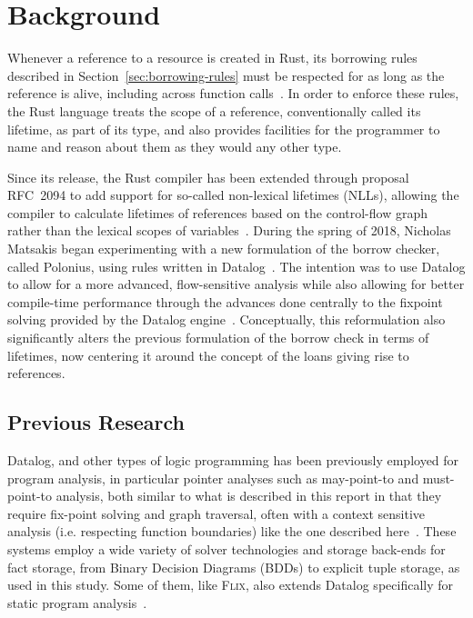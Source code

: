 \documentclass[11pt,a4paper,twoside,openany]{report}
\begin{document}
\chapter{Background}
Whenever a reference to a resource is created in Rust, its borrowing rules
described in Section~\ref{sec:borrowing-rules} must be respected for as long as
the reference is alive, including across function
calls~\cite{nichols_rust_nodate}. In order to enforce these rules, the Rust
language treats the scope of a reference, conventionally called its lifetime, as
part of its type, and also provides facilities for the programmer to name and
reason about them as they would any other type.

{\sloppy
Since its release, the Rust compiler has been extended through proposal RFC~2094
to add support for so-called non-lexical lifetimes (NLLs), allowing the compiler
to calculate lifetimes of references based on the control-flow graph rather than
the lexical scopes of variables~\cite{noauthor_rfc_2019}. During the spring of
2018, Nicholas Matsakis began experimenting with a new formulation of the borrow
checker, called Polonius, using rules written in
Datalog~\cite{matsakis_alias-based_2018}. The intention was to use Datalog to
allow for a more advanced, flow-sensitive analysis while also allowing for
better compile-time performance through the advances done centrally to the
fixpoint solving provided by the Datalog engine~\cite{datafrog}. Conceptually,
this reformulation also significantly alters the previous formulation of the
borrow check in terms of lifetimes, now centering it around the concept of the
loans giving rise to references.}

\section{Previous Research}
Datalog, and other types of logic programming has been previously employed for
program analysis, in particular pointer analyses such as may-point-to and
must-point-to analysis, both similar to what is described in this report in that
they require fix-point solving and graph traversal, often with a context
sensitive analysis (i.e. respecting function boundaries) like the
one described here~\cite{Dawson:1996:PPA:231379.231399,
  Berndl:2003:PAU:780822.781144, hajiyev_codequest:_2005,
  Whaley:2004:CCP:996893.996859, lam_context-sensitive_2005,
  Benton:2007:ISD:1273920.1273923, Hardekopf:2007:AGF:1250734.1250767,
  Smaragdakis:2011:PYC:1926385.1926390, smaragdakis_using_2010,
  balatsouras_datalog_2017, Madsen:2016:DFD:2908080.2908096,
  Eichberg:2008:DCC:1368088.1368142}. These systems employ a wide variety of
solver technologies and storage back-ends for fact storage, from Binary
Decision Diagrams (BDDs) to explicit tuple storage, as used in this study. Some
of them, like \textsc{Flix}, also extends Datalog specifically for static
program analysis~\cite{Madsen:2016:DFD:2908080.2908096}.
\end{document}
